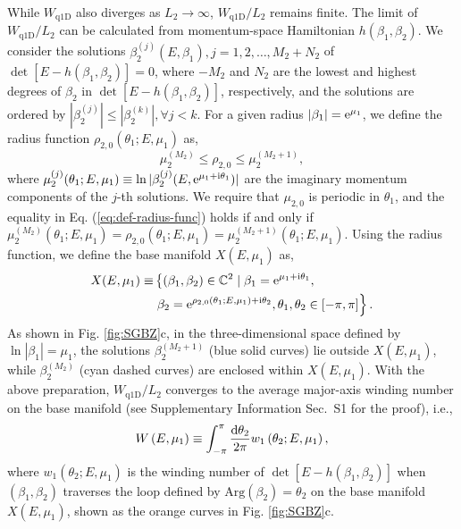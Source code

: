 While $W_{\text{q1D}}$ also diverges as $L_2 \rightarrow \infty$, $W_{\text{q1D}}/L_2$ remains finite. 
The limit of $W_{\text{q1D}}/L_2$ can be calculated from momentum-space Hamiltonian 
$h(\beta_1,\beta_2)$.
We consider
the solutions $\beta_{2}^{(j)}(E,\beta_{1}),j=1,2,\dots,M_{2}+N_{2}$
of $\det[E-h(\beta_{1},\beta_{2})]=0$, where $-M_{2}$ and $N_{2}$
are the lowest and highest degrees of $\beta_{2}$ in $\det[E-h(\beta_{1},\beta_{2})]$,
respectively, and the solutions are ordered by $|\beta_{2}^{(j)}|\leq|\beta_{2}^{(k)}|,\forall j<k$.
For a given radius $|\beta_{1}|=\mathrm{e}^{\mu_{1}}$,
we define the radius function  $\rho_{2,0}(\theta_{1};E,\mu_{1})$ as,
\begin{equation}
\mu_{2}^{(M_{2})}\leq\rho_{2,0}\leq\mu_{2}^{(M_{2}+1)},\label{eq:def-radius-func}
\end{equation}
where $\mu_{2}^{(j)}(\theta_{1};E,\mu_{1})\equiv\ln|\beta_{2}^{(j)}(E,\mathrm{e}^{\mu_{1}+\mathrm{i}\theta_{1}})|$
are the imaginary momentum components of the $j$-th solutions. We
require that $\mu_{2,0}$ is periodic in $\theta_{1}$, and the equality
in Eq. (\ref{eq:def-radius-func}) holds if and only if  $\mu_{2}^{(M_{2})}(\theta_{1};E,\mu_{1})=\rho_{2,0}(\theta_{1};E,\mu_{1})=\mu_{2}^{(M_{2}+1)}(\theta_{1};E,\mu_{1})$.
Using the radius function, we define the base manifold $X(E,\mu_{1})$
as, 
\begin{align}
X(E,\mu_{1})\equiv & \left\{ \left(\beta_{1},\beta_{2}\right)\in\mathbb{C}^{2}\mid\beta_{1}=\mathrm{e}^{\mu_{1}+\mathrm{i}\theta_{1}},\right.\nonumber \\
 & \left.\beta_{2}=\mathrm{e}^{\rho_{2,0}(\theta_{1};E,\mu_{1})+\mathrm{i}\theta_{2}},\theta_{1},\theta_{2}\in\left[-\pi,\pi\right]\right\} .\label{eq:base-manifold}
\end{align}
As shown in Fig. \ref{fig:SGBZ}c, in the three-dimensional space
defined by $\ln|\beta_{1}|=\mu_{1}$, the solutions $\beta_{2}^{(M_{2}+1)}$
(blue solid curves) lie outside $X(E,\mu_{1})$, while $\beta_{2}^{(M_{2})}$
(cyan dashed curves) are enclosed within $X(E,\mu_{1})$.  With the above preparation, $W_{\text{q1D}}/L_2$ converges to the average major-axis winding number on the base manifold (see Supplementary Information Sec.~S1 for the proof), i.e., 
\begin{equation}
W\left(E,\mu_{1}\right)\equiv\int_{-\pi}^{\pi}\frac{\mathrm{d}\theta_{2}}{2\pi}w_{1}\left(\theta_{2};E,\mu_{1}\right),
\end{equation}
where $w_{1}(\theta_{2};E,\mu_{1})$ is the winding number of $\det[E-h(\beta_{1},\beta_{2})]$
when $(\beta_{1},\beta_{2})$ traverses the loop defined by $\text{Arg}(\beta_{2})=\theta_{2}$
on the base manifold $X(E,\mu_{1})$, shown as the orange curves in
Fig. \ref{fig:SGBZ}c.  
$$
\text{}
$$


